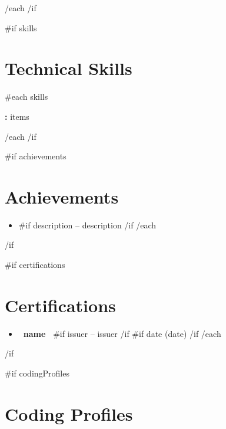 \documentclass[10pt,a4paper]{article}
\begin{document}
\vspace{4pt}

{{/each}}
{{/if}}

{{#if skills}}
\section{Technical Skills}

{{#each skills}}

\textbf{:}
{{items}}
\par
\vspace{2pt}

{{/each}}
{{/if}}

{{#if achievements}}
\section{Achievements}

\begin{itemize}
    {{#each achievements}}
    \item
    \textbf{ }
    {{#if description}}
    -- {{description}}
    {{/if}}
    {{/each}}
\end{itemize}

{{/if}}

{{#if certifications}}
\section{Certifications}

\begin{itemize}
    {{#each certifications}}
    \item
    \textbf{ {{~name~}} }
    {{#if issuer}}
    -- {{issuer}}
    {{/if}}
    {{#if date}}
    {\small\color{secondary} ({{date}})}
    {{/if}}
    {{/each}}
\end{itemize}

{{/if}}

{{#if codingProfiles}}
\section{Coding Profiles}
\end{document}
